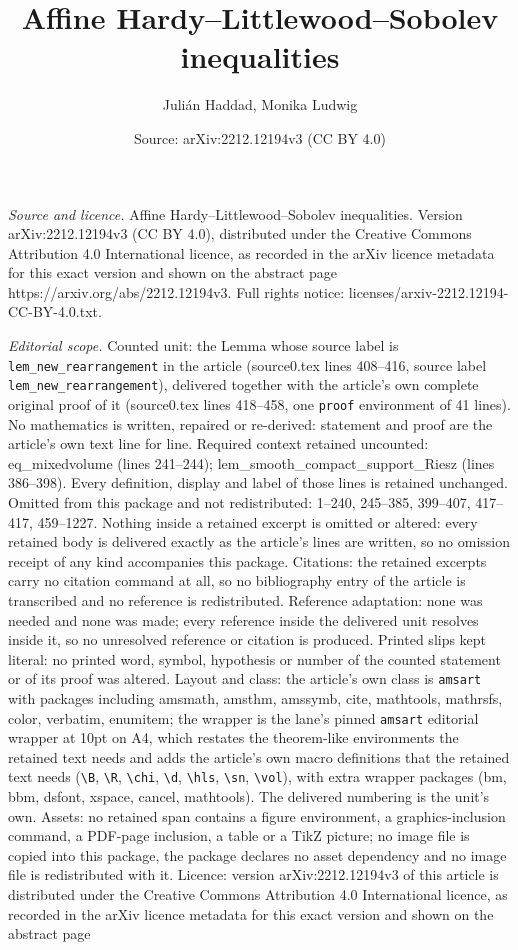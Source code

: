 \documentclass[10pt,a4paper]{amsart}
\title[Affine Hardy--Littlewood--Sobolev inequalities]{Affine Hardy--Littlewood--Sobolev inequalities}
\author{Juli\'an Haddad, Monika Ludwig}
\date{Source: arXiv:2212.12194v3 (CC BY 4.0)}
\begin{document}
\maketitle

\noindent\emph{Source and licence.} Affine Hardy--Littlewood--Sobolev inequalities. Version arXiv:2212.12194v3 (CC BY 4.0), distributed under the Creative Commons Attribution 4.0 International licence, as recorded in the arXiv licence metadata for this exact version and shown on the abstract page https://arxiv.org/abs/2212.12194v3. Full rights notice: licenses/arxiv-2212.12194-CC-BY-4.0.txt.\par\smallskip

\noindent\textit{Editorial scope.} Counted unit: the Lemma whose source label is \texttt{lem\_new\_rearrangement} in the article (source0.tex lines 408--416, source label \texttt{lem\_new\_rearrangement}), delivered together with the article's own complete original proof of it (source0.tex lines 418--458, one \texttt{proof} environment of 41 lines). No mathematics is written, repaired or re-derived: statement and proof are the article's own text line for line. Required context retained uncounted: eq\_mixedvolume (lines 241--244); lem\_smooth\_compact\_support\_Riesz (lines 386--398). Every definition, display and label of those lines is retained unchanged. Omitted from this package and not redistributed: 1--240, 245--385, 399--407, 417--417, 459--1227. Nothing inside a retained excerpt is omitted or altered: every retained body is delivered exactly as the article's lines are written, so no omission receipt of any kind accompanies this package. Citations: the retained excerpts carry no citation command at all, so no bibliography entry of the article is transcribed and no reference is redistributed. Reference adaptation: none was needed and none was made; every reference inside the delivered unit resolves inside it, so no unresolved reference or citation is produced. Printed slips kept literal: no printed word, symbol, hypothesis or number of the counted statement or of its proof was altered. Layout and class: the article's own class is \texttt{amsart} with packages including amsmath, amsthm, amssymb, cite, mathtools, mathrsfs, color, verbatim, enumitem; the wrapper is the lane's pinned \texttt{amsart} editorial wrapper at 10pt on A4, which restates the theorem-like environments the retained text needs and adds the article's own macro definitions that the retained text needs (\texttt{\textbackslash B}, \texttt{\textbackslash R}, \texttt{\textbackslash chi}, \texttt{\textbackslash d}, \texttt{\textbackslash hls}, \texttt{\textbackslash sn}, \texttt{\textbackslash vol}), with extra wrapper packages (bm, bbm, dsfont, xspace, cancel, mathtools). The delivered numbering is the unit's own. Assets: no retained span contains a figure environment, a graphics-inclusion command, a PDF-page inclusion, a table or a TikZ picture; no image file is copied into this package, the package declares no asset dependency and no image file is redistributed with it. Licence: version arXiv:2212.12194v3 of this article is distributed under the Creative Commons Attribution 4.0 International licence, as recorded in the arXiv licence metadata for this exact version and shown on the abstract page 
\end{document}
